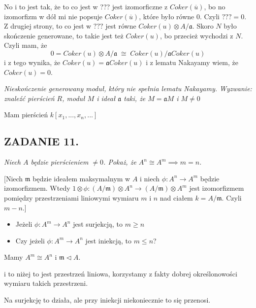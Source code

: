 \documentclass{article}
\begin{document}
No i to jest tak, że to co jest w ??? jest izomorficzne z $Coker(\overline{u})$, bo no izomorfizm w dół mi nie popsuje $Coker(\overline{u})$, które było równe $0$. Czyli $???=0$. Z drugiej strony, to co jest w $???$ jest równe $Coker(u)\otimes A/\mathfrak{a}$. Skoro $N$ było skończenie generowane, to takie jest też $Coker(u)$, bo przecież wychodzi z $N$. Czyli mam, że
$$0=Coker(u)\otimes A/\mathfrak{a}\;\cong\; Coker(u)/\mathfrak{a}Coker(u)$$
i z tego wynika, że $Coker(u)=\mathfrak{a}Coker(u)$ i z lematu Nakayamy wiem, że $Coker(u)=0$.


\emph{\color{orange}Nieskończenie generowany moduł, który nie spełnia lematu Nakayamy. Wyzwanie: znaleźć pierścień $R$, moduł $M$ i ideał $\mathfrak{a}$ taki, że $M=\mathfrak{a}M$ i $M\neq 0$}

Mam pierścień $k[x_1,...,x_n,...]$

\subsection*{ZADANIE 11.}
{\slshape\color{yellow}Niech $A$ będzie pierścieniem $\neq0$. Pokaż, że $A^n\cong A^m\implies m=n$.

[Niech $\mathfrak{m}$ będzie ideałem maksymalnym w $A$ i niech $\phi:A^n\to A^m$ będzie izomorfizmem. Wtedy $1\otimes\phi:(A/\mathfrak{m})\otimes A^n\to (A/\mathfrak{m})\otimes A^m$ jest izomorfizmem pomiędzy przestrzeniami liniowymi wymiaru $m$ i $n$ nad ciałem $k=A/\mathfrak{m}$. Czyli $m-n$.]

\begin{itemize}
    \item Jeżeli $\phi:A^m\to A^n$ jest surjekcją, to $m\geq n$
    \item Czy jeżeli $\phi:A^m\to A^n$ jest iniekcją, to $m\leq n$?
\end{itemize}}

Mamy $A^m\cong A^n$ i $\mathfrak{m}\triangleleft A$. 

\begin{center}
\end{center}

i to niżej to jest przestrzeń liniowa, korzystamy z fakty dobrej określonowości wymiaru takich przestrzeni.


Na surjekcję to działa, ale przy iniekcji niekoniecznie to się przenosi.
\end{document}
